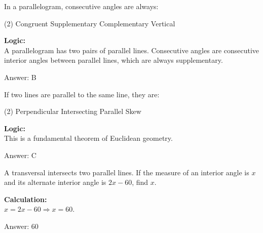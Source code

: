 \documentclass[11pt,paper=a4,answers]{exam}
\begin{document}
\begin{questions}
\question
In a parallelogram, consecutive angles are always:
\begin{tasks}(2)
    \task Congruent
    \task Supplementary
    \task Complementary
    \task Vertical
\end{tasks}

\begin{solution}
\textbf{Logic:} \\
A parallelogram has two pairs of parallel lines. Consecutive angles are consecutive interior angles between parallel lines, which are always supplementary.

\vspace{30pt}

Answer: \colorbox{yellow!100}{B}
\end{solution}

\vspace{60pt}

\question
If two lines are parallel to the same line, they are:
\begin{tasks}(2)
    \task Perpendicular
    \task Intersecting
    \task Parallel
    \task Skew
\end{tasks}

\begin{solution}
\textbf{Logic:} \\
This is a fundamental theorem of Euclidean geometry.

\vspace{30pt}

Answer: \colorbox{yellow!100}{C}
\end{solution}

\vspace{60pt}

\question
A transversal intersects two parallel lines. If the measure of an interior angle is $x$ and its alternate interior angle is $2x - 60$, find $x$.

\begin{solution}
\textbf{Calculation:} \\
$x = 2x - 60 \Rightarrow x = 60$.

\vspace{30pt}

Answer: \colorbox{yellow!100}{60}
\end{solution}


\end{questions}
\end{document}
